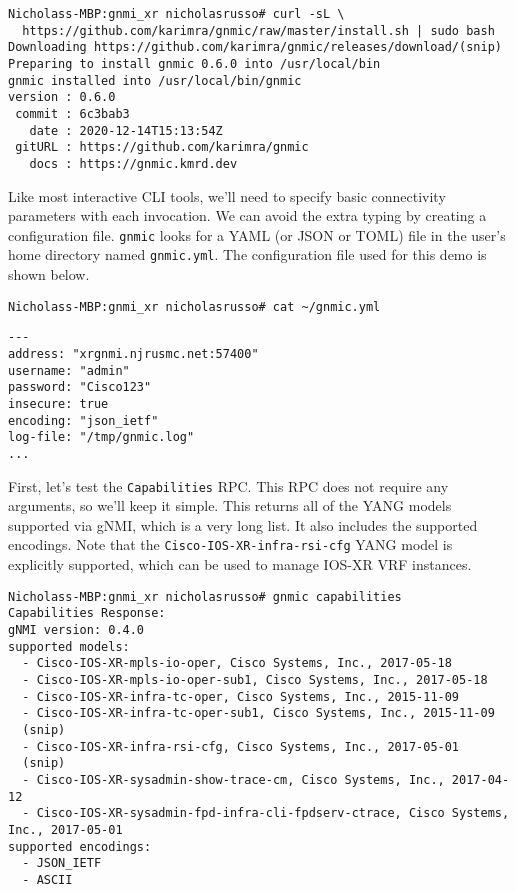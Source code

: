\begin{verbatim}
Nicholass-MBP:gnmi_xr nicholasrusso# curl -sL \
  https://github.com/karimra/gnmic/raw/master/install.sh | sudo bash
Downloading https://github.com/karimra/gnmic/releases/download/(snip)
Preparing to install gnmic 0.6.0 into /usr/local/bin
gnmic installed into /usr/local/bin/gnmic
version : 0.6.0
 commit : 6c3bab3
   date : 2020-12-14T15:13:54Z
 gitURL : https://github.com/karimra/gnmic
   docs : https://gnmic.kmrd.dev
\end{verbatim}

Like most interactive CLI tools, we'll need to specify basic connectivity
parameters with each invocation. We can avoid the extra typing by creating
a configuration file. \verb|gnmic| looks for a YAML (or JSON or TOML) file
in the user's home directory named \verb|gnmic.yml|. The configuration file
used for this demo is shown below.

\begin{verbatim}
Nicholass-MBP:gnmi_xr nicholasrusso# cat ~/gnmic.yml
\end{verbatim}

\begin{verbatim}
---
address: "xrgnmi.njrusmc.net:57400"
username: "admin"
password: "Cisco123"
insecure: true
encoding: "json_ietf"
log-file: "/tmp/gnmic.log"
...
\end{verbatim}


First, let's test the \verb|Capabilities| RPC\@. This RPC does not require any
arguments, so we'll keep it simple. This returns all of the YANG models
supported via gNMI, which is a very long list. It also includes the supported
encodings. Note that the \verb|Cisco-IOS-XR-infra-rsi-cfg| YANG model
is explicitly supported, which can be used to manage IOS-XR VRF instances.

\begin{verbatim}
Nicholass-MBP:gnmi_xr nicholasrusso# gnmic capabilities
Capabilities Response:
gNMI version: 0.4.0
supported models:
  - Cisco-IOS-XR-mpls-io-oper, Cisco Systems, Inc., 2017-05-18
  - Cisco-IOS-XR-mpls-io-oper-sub1, Cisco Systems, Inc., 2017-05-18
  - Cisco-IOS-XR-infra-tc-oper, Cisco Systems, Inc., 2015-11-09
  - Cisco-IOS-XR-infra-tc-oper-sub1, Cisco Systems, Inc., 2015-11-09
  (snip)
  - Cisco-IOS-XR-infra-rsi-cfg, Cisco Systems, Inc., 2017-05-01
  (snip)
  - Cisco-IOS-XR-sysadmin-show-trace-cm, Cisco Systems, Inc., 2017-04-12
  - Cisco-IOS-XR-sysadmin-fpd-infra-cli-fpdserv-ctrace, Cisco Systems, Inc., 2017-05-01
supported encodings:
  - JSON_IETF
  - ASCII
\end{verbatim}

